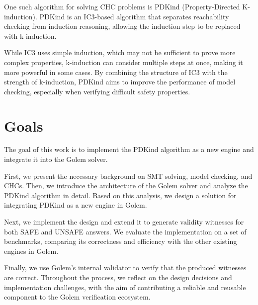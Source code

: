 One such algorithm for solving CHC problems is PDKind
(Property-Directed K-induction)\cite{7886665}. PDKind is an
IC3\cite{6148908}-based algorithm that separates reachability checking from
induction reasoning, allowing the induction step to be replaced with
k-induction.

While IC3 uses simple induction, which may not be sufficient to prove more
complex properties, k-induction can consider multiple steps at once, making it
more powerful in some cases. By combining the structure of IC3 with the
strength of k-induction, PDKind aims to improve the performance of model
checking, especially when verifying difficult safety properties.

\section{Goals}

\noindent The goal of this work is to implement the PDKind algorithm as a new
engine and integrate it into the Golem solver\cite{blicha_golem_2023}.

First, we present the necessary background on SMT solving, model checking, and
CHCs. Then, we introduce the architecture of the Golem solver and analyze the
PDKind algorithm in detail. Based on this analysis, we design a solution for
integrating PDKind as a new engine in Golem.

Next, we implement the design and extend it to generate validity witnesses for
both SAFE and UNSAFE answers. We evaluate the implementation on a set of
benchmarks, comparing its correctness and efficiency with the other existing
engines in Golem.

Finally, we use Golem’s internal validator to verify that the produced
witnesses are correct. Throughout the process, we reflect on the design
decisions and implementation challenges, with the aim of contributing a
reliable and reusable component to the Golem verification ecosystem.

